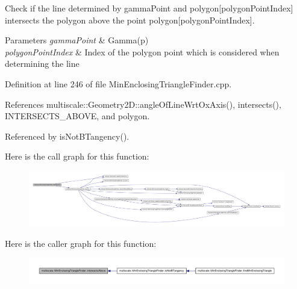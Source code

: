 \-Check if the line determined by gamma\-Point and polygon\mbox{[}polygon\-Point\-Index\mbox{]} intersects the polygon above the point polygon\mbox{[}polygon\-Point\-Index\mbox{]}. 


\begin{DoxyParams}{\-Parameters}
{\em gamma\-Point} & \-Gamma(p) \\
\hline
{\em polygon\-Point\-Index} & \-Index of the polygon point which is considered when determining the line \\
\hline
\end{DoxyParams}


\-Definition at line 246 of file \-Min\-Enclosing\-Triangle\-Finder.\-cpp.



\-References multiscale\-::\-Geometry2\-D\-::angle\-Of\-Line\-Wrt\-Ox\-Axis(), intersects(), \-I\-N\-T\-E\-R\-S\-E\-C\-T\-S\-\_\-\-A\-B\-O\-V\-E, and polygon.



\-Referenced by is\-Not\-B\-Tangency().



\-Here is the call graph for this function\-:\nopagebreak
\begin{figure}[H]
\begin{center}
\leavevmode
\includegraphics[width=350pt]{classmultiscale_1_1MinEnclosingTriangleFinder_aba0848fcc9021b379fd5f02a6708912d_cgraph}
\end{center}
\end{figure}




\-Here is the caller graph for this function\-:\nopagebreak
\begin{figure}[H]
\begin{center}
\leavevmode
\includegraphics[width=350pt]{classmultiscale_1_1MinEnclosingTriangleFinder_aba0848fcc9021b379fd5f02a6708912d_icgraph}
\end{center}
\end{figure}


